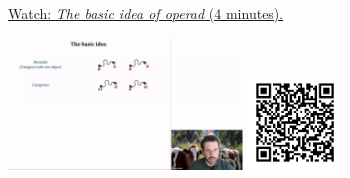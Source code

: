 
\begin{minipage}{10cm}
    \href{https://act4e-spring21.netlify.app/videos/spring2021-operads-a:intro-idea-operad.html}{Watch: \emph{The basic idea of operad} (4 minutes).}
        
    \href{https://act4e-spring21.netlify.app/videos/spring2021-operads-a:intro-idea-operad.html}{\includegraphics[height=3.5cm]{spring2021-operads-a:intro-idea-operad/thumbnails.jpg}}
    \href{https://act4e-spring21.netlify.app/videos/spring2021-operads-a:intro-idea-operad.html}{\includegraphics[height=2.5cm]{spring2021-operads-a:intro-idea-operad/qrcode.png}}
\end{minipage}
